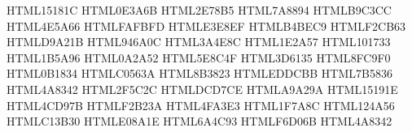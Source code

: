 \definecolor{cstInk}    {HTML}{15181C}
\definecolor{cstNavy}   {HTML}{0E3A6B}
\definecolor{cstBlue}   {HTML}{2E78B5}
\definecolor{cstSteel}  {HTML}{7A8894}
\definecolor{cstSteelL} {HTML}{B9C3CC}
\definecolor{cstSteelD} {HTML}{4E5A66}
\definecolor{cstShellL} {HTML}{FAFBFD}
\definecolor{cstShell}  {HTML}{E3E8EF}
\definecolor{cstShellD} {HTML}{B4BEC9}
\definecolor{cstMliL}   {HTML}{F2CB63}
\definecolor{cstMli}    {HTML}{D9A21B}
\definecolor{cstMliD}   {HTML}{946A0C}
\definecolor{cstCellL}  {HTML}{3A4E8C}
\definecolor{cstCell}   {HTML}{1E2A57}
\definecolor{cstCellD}  {HTML}{101733}
\definecolor{cstOcean}  {HTML}{1B5A96}
\definecolor{cstOceanD} {HTML}{0A2A52}
\definecolor{cstLand}   {HTML}{5E8C4F}
\definecolor{cstLandD}  {HTML}{3D6135}
\definecolor{cstAtmo}   {HTML}{8FC9F0}
\definecolor{cstSpace}  {HTML}{0B1834}
\definecolor{cstRoof}   {HTML}{C0563A}
\definecolor{cstRoofD}  {HTML}{8B3823}
\definecolor{cstRender} {HTML}{EDDCBB}
\definecolor{cstTimber} {HTML}{7B5836}
\definecolor{cstLeaf}   {HTML}{4A8342}
\definecolor{cstLeafD}  {HTML}{2F5C2C}
\definecolor{cstConcL}  {HTML}{DCD7CE}
\definecolor{cstConc}   {HTML}{A9A29A}
\definecolor{cstChassD} {HTML}{15191E}
\definecolor{cstLed}    {HTML}{4CD97B}
\definecolor{cstLedAmb} {HTML}{F2B23A}
\definecolor{cstScreen} {HTML}{4FA3E3}
\definecolor{cstTeal}   {HTML}{1F7A8C}
\definecolor{cstTealD}  {HTML}{124A56}
\definecolor{cstRed}    {HTML}{C13B30}
\definecolor{cstAmber}  {HTML}{E08A1E}
\definecolor{cstViolet} {HTML}{6A4C93}
\definecolor{cstBeam}   {HTML}{F6D06B}
\definecolor{cstGreen}  {HTML}{4A8342}

\newcommand{\cstShadow}[4]{%
  \fill[cstInk, opacity=0.13] (#1,#2) ellipse (#3 and #4);
  \fill[cstInk, opacity=0.10] (#1,#2) ellipse ({#3*0.55} and {#4*0.6});}

\newcommand{\cstGloss}[5]{%
  \fill[white, opacity=0.42, rotate around={#5:(#1,#2)}] (#1,#2) ellipse (#3 and #4);}

